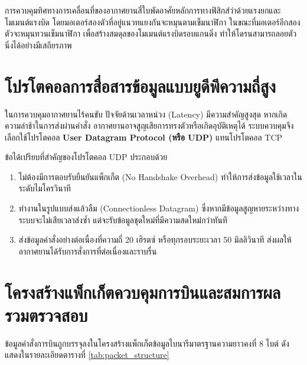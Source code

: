 การควบคุมทิศทางการเคลื่อนที่ของอากาศยานสี่ใบพัดอาศัยหลักการทางฟิสิกส์ว่าด้วยแรงยกและโมเมนต์แรงบิด โดยมอเตอร์สองตัวที่อยู่แนวทแยงกันจะหมุนตามเข็มนาฬิกา ในขณะที่มอเตอร์อีกสองตัวจะหมุนทวนเข็มนาฬิกา เพื่อสร้างสมดุลของโมเมนต์แรงบิดรอบแกนดิ่ง ทำให้โดรนสามารถลอยตัวนิ่งได้อย่างมีเสถียรภาพ

\section{โปรโตคอลการสื่อสารข้อมูลแบบยูดีพีความถี่สูง}

ในการควบคุมอากาศยานไร้คนขับ ปัจจัยด้านเวลาหน่วง (Latency) มีความสำคัญสูงสุด หากเกิดความล่าช้าในการส่งผ่านคำสั่ง อากาศยานอาจสูญเสียการทรงตัวหรือเกิดอุบัติเหตุได้ ระบบควบคุมจึงเลือกใช้โปรโตคอล \textbf{User Datagram Protocol (หรือ UDP)} แทนโปรโตคอล TCP

ข้อได้เปรียบที่สำคัญของโปรโตคอล UDP ประกอบด้วย
\begin{enumerate}
    \item ไม่ต้องมีการตอบรับยืนยันแพ็กเก็ต (No Handshake Overhead) ทำให้การส่งข้อมูลใช้เวลาในระดับไมโครวินาที
    \item ทำงานในรูปแบบส่งแล้วลืม (Connectionless Datagram) ซึ่งหากมีข้อมูลสูญหายระหว่างทาง ระบบจะไม่เสียเวลาส่งซ้ำ แต่จะรับข้อมูลชุดใหม่ที่มีความสดใหม่กว่าทันที
    \item ส่งข้อมูลคำสั่งอย่างต่อเนื่องที่ความถี่ 20 เฮิรตซ์ หรือทุกรอบระยะเวลา 50 มิลลิวินาที ส่งผลให้อากาศยานได้รับการสั่งการที่ต่อเนื่องและราบรื่น
\end{enumerate}

\section{โครงสร้างแพ็กเก็ตควบคุมการบินและสมการผลรวมตรวจสอบ}

ข้อมูลคำสั่งการบินถูกบรรจุลงในโครงสร้างแพ็กเก็ตข้อมูลไบนารีมาตรฐานความยาวคงที่ 8 ไบต์ ดังแสดงในรายละเอียดตารางที่ \ref{tab:packet_structure}

